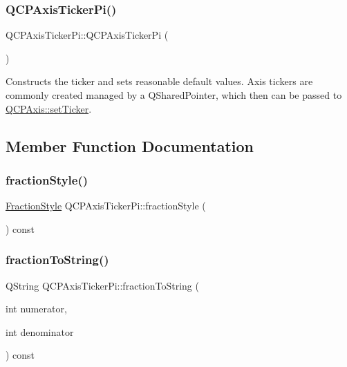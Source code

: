 \subsubsection{\texorpdfstring{Q\+C\+P\+Axis\+Ticker\+Pi()}{QCPAxisTickerPi()}}
{\footnotesize\ttfamily Q\+C\+P\+Axis\+Ticker\+Pi\+::\+Q\+C\+P\+Axis\+Ticker\+Pi (\begin{DoxyParamCaption}{ }\end{DoxyParamCaption})}

Constructs the ticker and sets reasonable default values. Axis tickers are commonly created managed by a Q\+Shared\+Pointer, which then can be passed to \hyperlink{class_q_c_p_axis_a4ee03fcd2c74d05cd1a419b9af5cfbdc}{Q\+C\+P\+Axis\+::set\+Ticker}. 

\subsection{Member Function Documentation}
\mbox{\label{class_q_c_p_axis_ticker_pi_ab532d5e838168a8a5bbafea4eafc94be}} 
\subsubsection{\texorpdfstring{fraction\+Style()}{fractionStyle()}}
{\footnotesize\ttfamily \hyperlink{class_q_c_p_axis_ticker_pi_a262f1534c7f0c79a7d5237f5d1e2c54c}{Fraction\+Style} Q\+C\+P\+Axis\+Ticker\+Pi\+::fraction\+Style (\begin{DoxyParamCaption}{ }\end{DoxyParamCaption}) const\hspace{0.3cm}{\ttfamily [inline]}}

\mbox{\label{class_q_c_p_axis_ticker_pi_afb59d434358173eb5b58e41255bea904}} 
\subsubsection{\texorpdfstring{fraction\+To\+String()}{fractionToString()}}
{\footnotesize\ttfamily Q\+String Q\+C\+P\+Axis\+Ticker\+Pi\+::fraction\+To\+String (\begin{DoxyParamCaption}\item[{int}]{numerator,  }\item[{int}]{denominator }\end{DoxyParamCaption}) const\hspace{0.3cm}{\ttfamily [protected]}}

